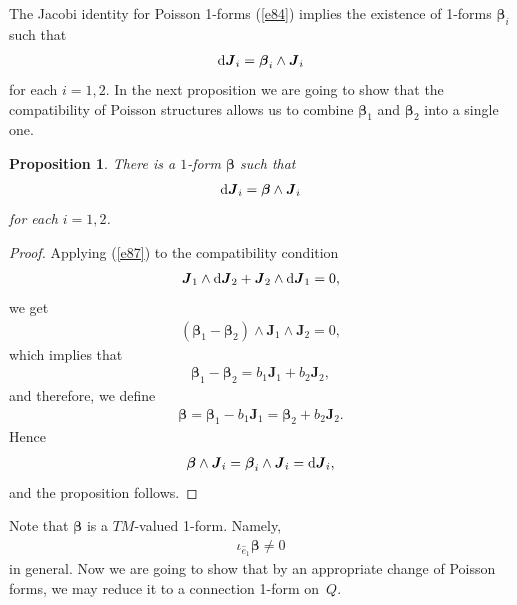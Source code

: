 \documentclass[pdftex]{sigma}
\numberwithin{equation}{section}
\newtheorem{Proposition}[Theorem]{Proposition}
 { \theoremstyle{definition}
\newtheorem{Definition}[Theorem]{Definition} }
\begin{document}
The Jacobi identity for Poisson 1-forms (\ref{e84}) implies the existence of 1-forms $\boldsymbol{\beta }_{i}$ such that
\begin{gather}
{\rm d}\boldsymbol{J}_{i}=\boldsymbol{\beta }_{i}\wedge \boldsymbol{J}_{i} \label{e87}
\end{gather}
for each $i=1,2$. In the next proposition we are going to show that the compatibility of Poisson structures allows us to combine $\boldsymbol{\beta }_{1} $ and $\boldsymbol{\beta }_{2}$ into a single one.

\begin{Proposition}\label{proposition5}
There is a $1$-form $\boldsymbol{\beta }$ such that
\begin{gather*}
{\rm d}\boldsymbol{J}_{i}=\boldsymbol{\beta }\wedge \boldsymbol{J}_{i} %
\end{gather*}
for each $i=1,2$.
\end{Proposition}

\begin{proof}
Applying (\ref{e87}) to the compatibility condition
\begin{gather*}
\boldsymbol{J}_{1}\wedge {\rm d}\boldsymbol{J}_{2}+\boldsymbol{J}_{2}\wedge {\rm d}\boldsymbol{J}_{1}=0,
\end{gather*}
we get
\begin{gather*}
 ( \boldsymbol{\beta }_{1}-\boldsymbol{\beta }_{2} ) \wedge \boldsymbol{J}_{1}\wedge \boldsymbol{J}_{2}=0,
\end{gather*}
which implies that
\begin{gather*}
\boldsymbol{\beta }_{1}-\boldsymbol{\beta }_{2}=b_{1}\boldsymbol{J}_{1}+b_{2}\boldsymbol{J}_{2},
\end{gather*}
and therefore, we def\/ine
\begin{gather*}
\boldsymbol{\beta }=\boldsymbol{\beta }_{1}-b_{1}\boldsymbol{J}_{1}=\boldsymbol{\beta }_{2}+b_{2}\boldsymbol{J}_{2}.
\end{gather*}
Hence
\begin{gather*}
\boldsymbol{\beta }\wedge \boldsymbol{J}_{i}=\boldsymbol{\beta }_{i}\wedge \boldsymbol{J}_{i}={\rm d}\boldsymbol{J}_{i},
\end{gather*}
and the proposition follows.
\end{proof}

Note that $\boldsymbol{\beta }$ is a $TM$-valued 1-form. Namely,
\begin{gather*}
\iota _{\widehat{e}_{1}}\boldsymbol{\beta }\neq 0
\end{gather*}
in general. Now we are going to show that by an appropriate change of Poisson forms, we may reduce it to a connection 1-form on~$Q$.
\end{document}
